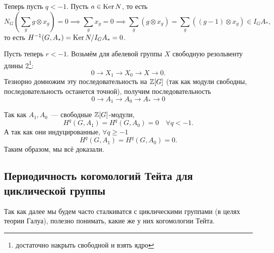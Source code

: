  	 Теперь пусть $q < -1$. Пусть $a \in \operatorname{Ker}{N}$, то есть 
 	 \[
 	 	N_G(\sum_{g} g \otimes x_{g}) = 0 \implies \sum_{g} x_{g} = 0 \implies \sum_{g} (g \otimes x_g) = \sum_{g} ((g - 1) \otimes x_g) \in I_G A_*,
 	 \]
 	 то есть $H^{-1}(G, A_*) = \operatorname{Ker}{N}/I_G A_* = 0$. 

 	 Пусть теперь $r < -1$. Возьмём для абелевой группы $X$ свободную резольвенту длины 2\footnote{достаточно накрыть свободной и взять ядро}: 
 	 \[
 	 	0 \to X_1 \to X_0 \to X \to 0.
 	 \]
 	 Тезнорно домножим эту последовательность на $\mathbb{Z}[G]$ (так как модули свободны, последовательность останется точной), получим последовательность 
 	 \[
 	 	 0 \to A_1 \to A_0 \to A_* \to 0
 	 \]

 	 Так как $A_1, A_0$~--- свободные $\mathbb{Z}[G]$-модули, 
 	 \[
 	 	H^{q}(G, A_1) = H^{q}(G, A_0) = 0 \quad \forall q < -1.
 	 \]
 	 А так как они индуцированные, $\forall q \ge -1$ 
 	 \[
 	 	H^{q}(G, A_1) = H^{q}(G, A_0) = 0.
 	 \]
 	 Таким образом, мы всё доказали. 


    \subsection{Периодичность когомологий Тейта для циклической группы}

 	 Так как далее мы будем часто сталкиватся с циклическими группами (в целях теории Галуа), полезно понимать, какие же у них когомологии Тейта. 

